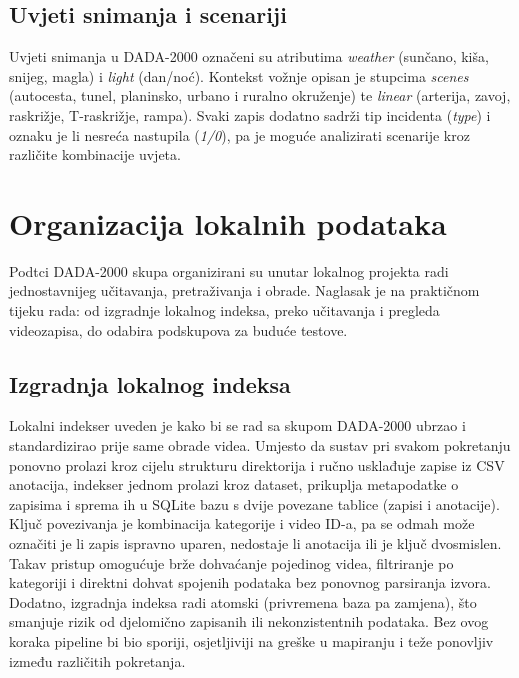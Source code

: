 \subsection{Uvjeti snimanja i scenariji}
Uvjeti snimanja u DADA-2000 označeni su atributima \textit{weather} (sunčano, kiša, snijeg, magla) i \textit{light} (dan/noć). Kontekst vožnje opisan je stupcima \textit{scenes} (autocesta, tunel, planinsko, urbano i ruralno okruženje) te \textit{linear} (arterija, zavoj, raskrižje, T-raskrižje, rampa). Svaki zapis dodatno sadrži tip incidenta (\textit{type}) i oznaku je li nesreća nastupila (\textit{1/0}), pa je moguće analizirati scenarije kroz različite kombinacije uvjeta.

\section{Organizacija lokalnih podataka}
Podtci DADA-2000 skupa organizirani su unutar lokalnog projekta radi jednostavnijeg učitavanja, pretraživanja i obrade. Naglasak je na praktičnom tijeku rada: od izgradnje lokalnog indeksa, preko učitavanja i pregleda videozapisa, do odabira podskupova za buduće testove.

\subsection{Izgradnja lokalnog indeksa}
Lokalni indekser uveden je kako bi se rad sa skupom DADA-2000 ubrzao i standardizirao prije same obrade videa. Umjesto da sustav pri svakom pokretanju ponovno prolazi kroz cijelu strukturu direktorija i ručno usklađuje zapise iz CSV anotacija, indekser jednom prolazi kroz dataset, prikuplja metapodatke o zapisima i sprema ih u SQLite\supercite{sqlite} bazu s dvije povezane tablice (zapisi i anotacije). Ključ povezivanja je kombinacija kategorije i video ID-a, pa se odmah može označiti je li zapis ispravno uparen, nedostaje li anotacija ili je ključ dvosmislen. Takav pristup omogućuje brže dohvaćanje pojedinog videa, filtriranje po kategoriji i direktni dohvat spojenih podataka bez ponovnog parsiranja izvora. Dodatno, izgradnja indeksa radi atomski (privremena baza pa zamjena), što smanjuje rizik od djelomično zapisanih ili nekonzistentnih podataka. Bez ovog koraka pipeline bi bio sporiji, osjetljiviji na greške u mapiranju i teže ponovljiv između različitih pokretanja.

